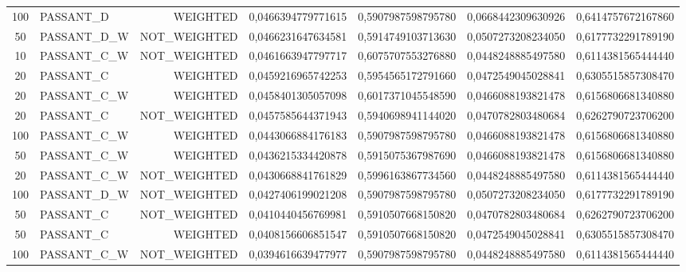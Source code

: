 \begin{table}[H]
{\begin{tabular}{ c l r c c c c }
				100 &  PASSANT\_D &   WEIGHTED & 0,0466394779771615 & 0,5907987598795780 & 0,0668442309630926 & 0,6414757672167860 \\
				
				50 & PASSANT\_D\_W & NOT\_WEIGHTED & 0,0466231647634581 & 0,5914749103713630 & 0,0507273208234050 & 0,6177732291789190 \\
				
				10 & PASSANT\_C\_W & NOT\_WEIGHTED & 0,0461663947797717 & 0,6075707553276880 & 0,0448248885497580 & 0,6114381565444440 \\
				
				20 &  PASSANT\_C &   WEIGHTED & 0,0459216965742253 & 0,5954565172791660 & 0,0472549045028841 & 0,6305515857308470 \\
				
				20 & PASSANT\_C\_W &   WEIGHTED & 0,0458401305057098 & 0,6017371045548590 & 0,0466088193821478 & 0,6156806681340880 \\
				
				20 &  PASSANT\_C & NOT\_WEIGHTED & 0,0457585644371943 & 0,5940698941144020 & 0,0470782803480684 & 0,6262790723706200 \\
				
				100 & PASSANT\_C\_W &   WEIGHTED & 0,0443066884176183 & 0,5907987598795780 & 0,0466088193821478 & 0,6156806681340880 \\
				
				50 & PASSANT\_C\_W &   WEIGHTED & 0,0436215334420878 & 0,5915075367987690 & 0,0466088193821478 & 0,6156806681340880 \\
				
				20 & PASSANT\_C\_W & NOT\_WEIGHTED & 0,0430668841761829 & 0,5996163867734560 & 0,0448248885497580 & 0,6114381565444440 \\
				
				100 & PASSANT\_D\_W & NOT\_WEIGHTED & 0,0427406199021208 & 0,5907987598795780 & 0,0507273208234050 & 0,6177732291789190 \\
				
				50 &  PASSANT\_C & NOT\_WEIGHTED & 0,0410440456769981 & 0,5910507668150820 & 0,0470782803480684 & 0,6262790723706200 \\
				
				50 &  PASSANT\_C &   WEIGHTED & 0,0408156606851547 & 0,5910507668150820 & 0,0472549045028841 & 0,6305515857308470 \\
				
				100 & PASSANT\_C\_W & NOT\_WEIGHTED & 0,0394616639477977 & 0,5907987598795780 & 0,0448248885497580 & 0,6114381565444440 \\
				

\end{tabular}}
\end{table}
